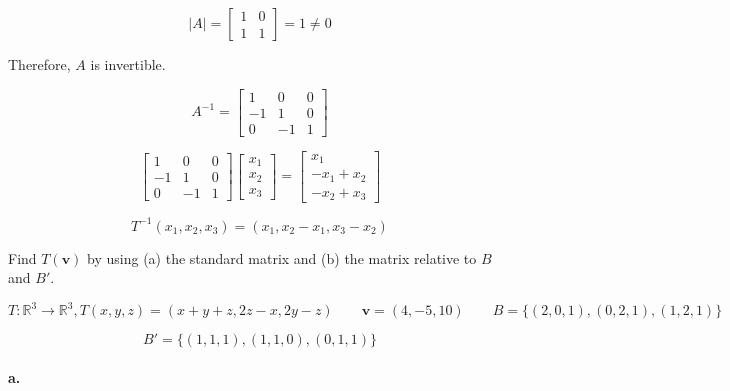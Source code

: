 \documentclass{report}
\begin{document}
$$
| A | = \begin{bmatrix} 1 & 0 \\ 1 & 1 \end{bmatrix} = 1 \ne 0
$$

\noindent Therefore, $A$ is invertible.

$$
A^{-1} = \begin{bmatrix} 1 & 0 & 0 \\ -1 & 1 & 0 \\ 0 & -1 & 1 \end{bmatrix} 
$$

$$
\begin{bmatrix} 1 & 0 & 0 \\ -1 & 1 & 0 \\ 0 & -1 & 1 \end{bmatrix} \begin{bmatrix} x_1 \\ x_2 \\ x_3 \end{bmatrix} = \begin{bmatrix} x_1 \\ -x_1 + x_2 \\ -x_2 + x_3 \end{bmatrix}
$$

$$
T^{-1} (x_1, x_2, x_3) = (x_1, x_2 - x_1, x_3 - x_2)
$$

\begin{tcolorbox}[colframe = lightred]
	Find $T(\bm{v})$ by using (a) the standard matrix and (b) the matrix relative to $B$ and $B'$.
	
	$$
	T: \mathbb{R}^3 \to \mathbb{R}^3, T(x,y,z) = (x+y+z, 2z-x, 2y-z) \quad \quad \bm{v} = (4,-5,10) \quad \quad B  = \{ (2,0,1), (0,2,1), (1,2,1)\}
	$$
	
	$$
	B' = \{ (1,1,1), (1,1,0), (0,1,1)\}
	$$
\end{tcolorbox}

\paragraph{a.}
\end{document}
